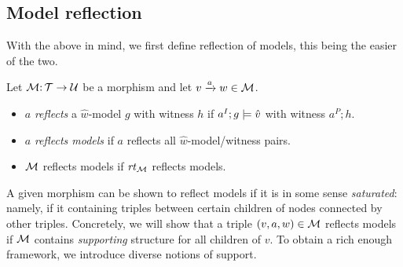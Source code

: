\subsection{Model reflection}

With the above in mind, we first define reflection of models, this being the easier of the two.

\begin{definition}
Let ${\mathcal{M}}{:}\, {\mathcal{T}}\rightarrow{\mathcal{U}}$ be a morphism and let ${v}\xrightarrow{a}{w}\in{\mathcal{M}}$.
\begin{itemize}
\item $a$ \emph{reflects} a $\hat w$-model $g$ with witness $h$ if $a^I;g\models \hat v$ with witness $a^P;h$.

\item $a$ \emph{reflects models} if $a$ reflects all $\hat w$-model/witness pairs.

\item ${\mathcal{M}}$ reflects models if $\mathit{rt}_{{\mathcal{M}}}$ reflects models.
\end{itemize}
\end{definition}
%
A given morphism can be shown to reflect models if it is in some sense \emph{saturated}: namely, if it containing triples between certain children of nodes connected by other triples. Concretely, we will show that a triple $(v,a,w)\in {\mathcal{M}}$ reflects models if ${\mathcal{M}}$ contains \emph{supporting} structure for all children of $v$. To obtain a rich enough framework, we introduce diverse notions of support.

